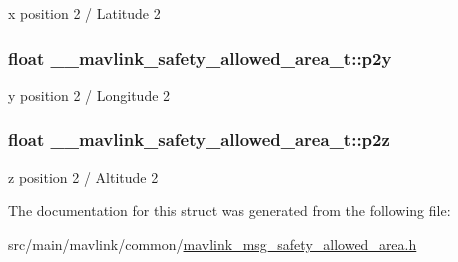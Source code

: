 x position 2 / Latitude 2 

\hypertarget{struct____mavlink__safety__allowed__area__t_a4e149f8f37b1d5987602ac3e49a65a66}{
\subsubsection[{p2y}]{\setlength{\rightskip}{0pt plus 5cm}float \+\_\+\+\_\+mavlink\+\_\+safety\+\_\+allowed\+\_\+area\+\_\+t\+::p2y}}\label{struct____mavlink__safety__allowed__area__t_a4e149f8f37b1d5987602ac3e49a65a66}


y position 2 / Longitude 2 

\hypertarget{struct____mavlink__safety__allowed__area__t_a9af8420ae1c69890ec5dfafd54785d91}{
\subsubsection[{p2z}]{\setlength{\rightskip}{0pt plus 5cm}float \+\_\+\+\_\+mavlink\+\_\+safety\+\_\+allowed\+\_\+area\+\_\+t\+::p2z}}\label{struct____mavlink__safety__allowed__area__t_a9af8420ae1c69890ec5dfafd54785d91}


z position 2 / Altitude 2 



The documentation for this struct was generated from the following file\+:\begin{DoxyCompactItemize}
\item 
src/main/mavlink/common/\hyperlink{mavlink__msg__safety__allowed__area_8h}{mavlink\+\_\+msg\+\_\+safety\+\_\+allowed\+\_\+area.\+h}\end{DoxyCompactItemize}
